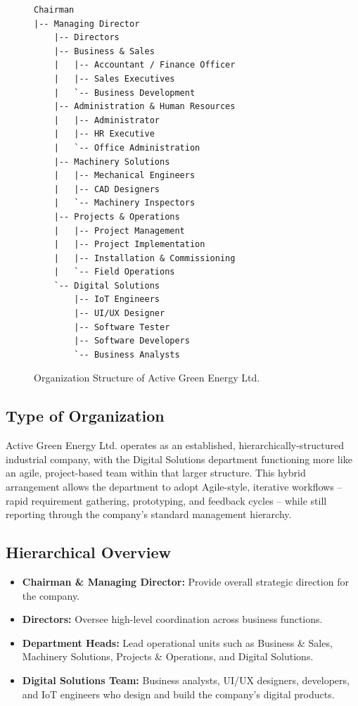 \begin{figure}[H]
    \centering
    \begin{verbatim}
Chairman
|-- Managing Director
    |-- Directors
    |-- Business & Sales
    |   |-- Accountant / Finance Officer
    |   |-- Sales Executives
    |   `-- Business Development
    |-- Administration & Human Resources
    |   |-- Administrator
    |   |-- HR Executive
    |   `-- Office Administration
    |-- Machinery Solutions
    |   |-- Mechanical Engineers
    |   |-- CAD Designers
    |   `-- Machinery Inspectors
    |-- Projects & Operations
    |   |-- Project Management
    |   |-- Project Implementation
    |   |-- Installation & Commissioning
    |   `-- Field Operations
    `-- Digital Solutions
        |-- IoT Engineers
        |-- UI/UX Designer
        |-- Software Tester
        |-- Software Developers
        `-- Business Analysts
    \end{verbatim}
    \caption{Organization Structure of Active Green Energy Ltd.}
    \label{fig:company-structure}
\end{figure}

\subsection{Type of Organization}
\par Active Green Energy Ltd. operates as an established, hierarchically-structured industrial company, with the Digital Solutions department functioning more like an agile, project-based team within that larger structure. This hybrid arrangement allows the department to adopt Agile-style, iterative workflows -- rapid requirement gathering, prototyping, and feedback cycles -- while still reporting through the company's standard management hierarchy.

\subsection{Hierarchical Overview}
\begin{itemize}
    \item \textbf{Chairman \& Managing Director:} Provide overall strategic direction for the company.
    \item \textbf{Directors:} Oversee high-level coordination across business functions.
    \item \textbf{Department Heads:} Lead operational units such as Business \& Sales, Machinery Solutions, Projects \& Operations, and Digital Solutions.
    \item \textbf{Digital Solutions Team:} Business analysts, UI/UX designers, developers, and IoT engineers who design and build the company's digital products.
\end{itemize}

